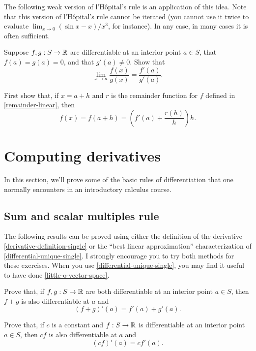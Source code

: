 The following weak version of l'H\^opital's rule is an application of this idea. 
Note that this version of l'H\^opital's rule cannot be iterated (you cannot use it twice to evaluate $\lim_{x \to 0} (\sin x - x)/x^3$, for instance). In any case, in many cases it is often sufficient. 

\begin{exercise} \label{lhopital-weak}
	Suppose $f, g : S \to \mathbb{R}$ are differentiable at an interior point $a \in S$, that $f(a) = g(a) = 0$, and that $g'(a) \neq 0$. Show that
	\[ \lim_{x \to a} \frac{f(x)}{g(x)} = \frac{f'(a)}{g'(a)}. \]
	\begin{hint} 
		First show that, if $x = a+h$ and $r$ is the remainder function for $f$ defined in \cref{remainder-linear}, then
		\[ f(x) = f(a+h) = \left( f'(a) + \frac{r(h)}{h} \right)h. \]
	\end{hint}
\end{exercise} 

\section{Computing derivatives}

In this section, we'll prove some of the basic rules of differentiation that one normally encounters in an introductory calculus course. 

\subsection{Sum and scalar multiples rule}

The following results can be proved using either the definition of the derivative \ref{derivative-definition-single} or the ``best linear approximation'' characterization of \cref{differential-unique-single}. I strongly encourage you to try both methods for these exercises. 
When you use \cref{differential-unique-single}, you may find it useful to have done \cref{little-o-vector-space}. 

\begin{exercise} \label{sum-rule-single} 
	Prove that, if $f, g : S \to \mathbb{R}$ are both differentiable at an interior point $a \in S$, then $f + g$ is also differentiable at $a$ and \[ (f+g)'(a) = f'(a) + g'(a). \]
\end{exercise}

\begin{exercise}  \label{scalar-multiples-rule-single}
	Prove that, if $c$ is a constant and $f : S \to \mathbb{R}$ is differentiable at an interior point $a \in S$, then $cf$ is also differentiable at $a$ and \[ (cf)'(a) = c f'(a). \]
\end{exercise}

